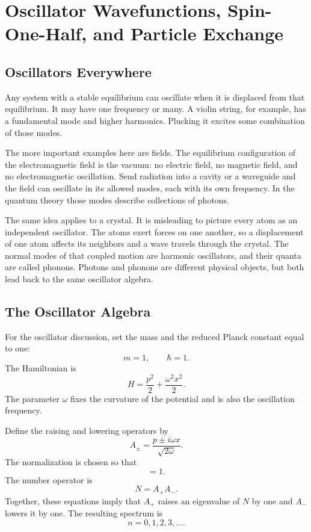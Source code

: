 \chapter{Oscillator Wavefunctions, Spin-One-Half, and Particle Exchange}

\section{Oscillators Everywhere}

Any system with a stable equilibrium can oscillate when it is displaced from that equilibrium. It may have one frequency or many. A violin string, for example, has a fundamental mode and higher harmonics. Plucking it excites some combination of those modes.

The more important examples here are fields. The equilibrium configuration of the electromagnetic field is the vacuum: no electric field, no magnetic field, and no electromagnetic oscillation. Send radiation into a cavity or a waveguide and the field can oscillate in its allowed modes, each with its own frequency. In the quantum theory those modes describe collections of photons.

The same idea applies to a crystal. It is misleading to picture every atom as an independent oscillator. The atoms exert forces on one another, so a displacement of one atom affects its neighbors and a wave travels through the crystal. The normal modes of that coupled motion are harmonic oscillators, and their quanta are called phonons. Photons and phonons are different physical objects, but both lead back to the same oscillator algebra.

\section{The Oscillator Algebra}

For the oscillator discussion, set the mass and the reduced Planck constant equal to one:
\[
m=1,\qquad \hbar=1.
\]
The Hamiltonian is
\begin{equation}
H=\frac{p^{2}}{2}+\frac{\omega^{2}x^{2}}{2}.
\end{equation}
The parameter \(\omega\) fixes the curvature of the potential and is also the oscillation frequency.

Define the raising and lowering operators by
\begin{equation}
A_{\pm}=\frac{p\pm i\omega x}{\sqrt{2\omega}}.
\end{equation}
The normalization is chosen so that
\begin{equation}
[A_{-},A_{+}]=1.
\end{equation}
The number operator is
\begin{equation}
N=A_{+}A_{-}.
\end{equation}
Together, these equations imply that \(A_{+}\) raises an eigenvalue of \(N\) by one and \(A_{-}\) lowers it by one. The resulting spectrum is
\begin{equation}
n=0,1,2,3,\ldots .
\end{equation}

